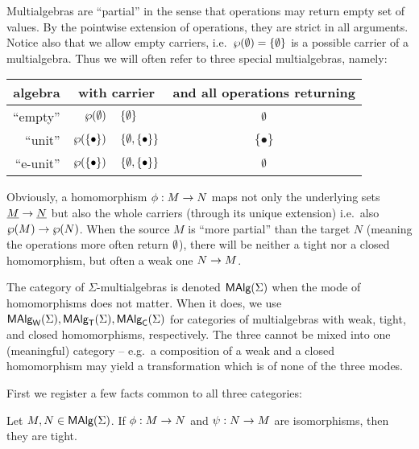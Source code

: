 \documentclass[10pt]{article}
\begin{document}

Multialgebras are ``partial'' in the sense that operations may return
empty set of values. By the pointwise extension of operations, they
are strict in all arguments.  Notice also that we allow empty
carriers, i.e.\ $\wp(\emptyset)=\{\emptyset\}$ is a possible carrier of a
multialgebra. Thus we will often refer to three special multialgebras,
namely:

\begin{center}
\begin{tabular}{r|r@{\ =\ }l@{\ \ }c}
algebra     & \multicolumn{2}{c}{with carrier} & and all operations returning \\ \hline
``empty''   & $\wp(\emptyset)$ & $\{\emptyset\} $ & $\emptyset$ \\[.5ex]
``unit''    & $\wp(\{\bullet\})$ & $\{\emptyset,\{\bullet\}\}$ & $\{\bullet\}$  \\[.5ex]
``e-unit''  & $\wp(\{\bullet\})$ & $\{\emptyset,\{\bullet\}\}$ & $\emptyset$
\end{tabular} 
\end{center}

\noindent

Obviously, a homomorphism $\phi:M\rightarrow N$ maps not only the underlying
sets $\underline {M}\rightarrow \underline {N}$ but also the whole carriers (through its
unique extension) i.e.\ also $\wp(M)\rightarrow\wp(N)$.  When the source
$M$ is ``more partial'' than the target $N$ (meaning the operations
more often return $\emptyset$), there will be neither a tight nor a closed
homomorphism, but often a weak one $N\rightarrow M$.

The category of $\Sigma$-multialgebras is denoted $\mbox{\rm\sf MAlg}(\Sigma)$ when the mode
of homomorphisms does not matter. When it does, we use $\mbox{\rm\sf MAlg}_{\sf W}(\Sigma), \mbox{\rm\sf MAlg}_{\sf T}(\Sigma),
\mbox{\rm\sf MAlg}_{\sf C}(\Sigma)$ for categories of multialgebras with weak, tight, and closed
homomorphisms, respectively. The three cannot be mixed into one
(meaningful) category -- e.g.\ a composition of a weak and a closed
homomorphism may yield a transformation which is of none of the three
modes.

\bigskip

First we register a few facts common to all three categories:
%
\begin{Prop}
\label{le:isotight}
Let $M, N\in\mbox{\rm\sf MAlg}(\Sigma)$. If $\phi:M\rightarrow N$ and $\psi:N\rightarrow M$ are
isomorphisms, then they are tight.
\end{Prop}
\end{document}
